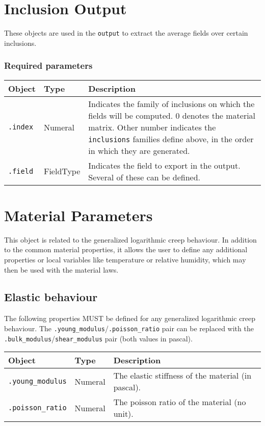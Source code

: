 \documentclass[10pt]{article}
\begin{document}
\section{Inclusion Output}

These objects are used in the \verb+output+ to extract the average fields over certain inclusions.

\subsubsection*{Required parameters}

\begin{tabularx}{\textwidth}{llX}
\hline 
Object & Type & Description \\ 
\hline 
\verb+.index+ & Numeral & Indicates the family of inclusions on which the fields will be computed. 0 denotes the material matrix. Other number indicates the \verb+inclusions+ families define above, in the order in which they are generated. \\ 
\verb+.field+ & FieldType & Indicates the field to export in the output. Several of these can be defined.\\
\hline 
\end{tabularx}


\section{Material Parameters}

This object is related to the generalized logarithmic creep behaviour. In addition to the common material properties, it allows the user to define any additional properties or local variables like temperature or relative humidity, which may then be used with the material laws.

\subsection{Elastic behaviour}

The following properties MUST be defined for any generalized logarithmic creep behaviour. The \verb+.young_modulus+/\verb+.poisson_ratio+ pair can be replaced with the \verb+.bulk_modulus+/\verb+shear_modulus+ pair (both values in pascal).\\

\begin{tabularx}{\textwidth}{llX}
\hline 
Object & Type & Description \\ 
\hline 
\verb+.young_modulus+ & Numeral & The elastic stiffness of the material (in pascal).\\
\verb+.poisson_ratio+ & Numeral & The poisson ratio of the material (no unit).\\
\hline 
\end{tabularx}
\end{document}
